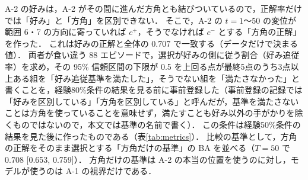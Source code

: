 A-2 の好みは，A-2 がその間に進んだ方角とも結びついているので，正解率だけでは「好み」と「方角」を区別できない．
そこで，A-2 の $t=1$〜50 の変位が範囲 6・7 の方向に寄っていれば $c^{+}$，そうでなければ $c^{-}$ とする「方角の正解」を作った．
これは好みの正解と全体の 0.707 で一致する（データだけで決まる値）．
両者が食い違う 88 エピソードで，選択が好みの側に従う割合（好み追従率）を求め，その 95\% 信頼区間の下限が 0.5 を上回る点が最終5点のうち3点以上ある組を「好み追従基準を満たした」，そうでない組を「満たさなかった」と書くことを，経験80\%条件の結果を見る前に事前登録した（事前登録の記録では「好みを区別している」「方角を区別している」と呼んだが，基準を満たさないことは方角を使っていることを意味せず，満たすことも好み以外の手がかりを除くものではないので，本文では基準の名前で書く）．
この条件は経験50\%条件の結果を見た後に作ったものである（表\ref{tab:metrics}）．
比較の基準として，方角の正解をそのまま選択とする「方角だけの基準」の BA を並べる（$T=50$ で 0.708 [0.653, 0.759]）．
方角だけの基準は A-2 の本当の位置を使うのに対し，モデルが使うのは A-1 の視界だけである．
